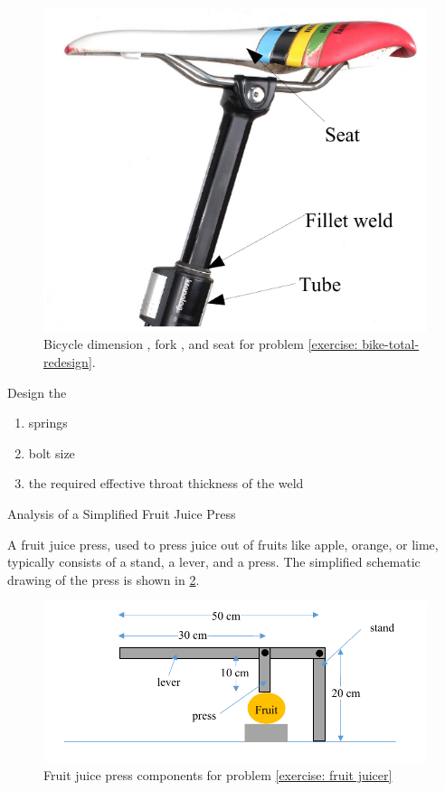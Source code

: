 \documentclass[
10pt,
a4paper,
openany,
svgnames,
]{book}
\newcommand{\exercise}{%
\item \label{lab:\arabic{chapter}-\arabic{exercisesi}}  %
}
\begin{document}
\begin{exercises}
\begin{figure}[h]
    \includegraphics[scale=0.7]{pictures/Machine-interaction/bicycle-seat}
    \caption{Bicycle dimension \cite{ai2bike}, fork \cite{zackbikefork}, and seat \cite{dresselseatpost} for problem \ref{exercise: bike-total-redesign}. }
    \label{fig: bike-example}
  \end{figure}
  
  Design the
  \begin{enumerate}
  \item springs
  \item bolt size
  \item the required effective throat thickness of the weld
  \end{enumerate}
  
  \exercise \label{exercise: fruit juicer} Analysis of a Simplified Fruit Juice Press
  
  A fruit juice press, used to press juice out of fruits like apple, orange, or lime, typically consists of a stand, a lever, and a press. The simplified schematic drawing of the press is shown in \cref{fig: fruit juicer}.
  
  \begin{figure}[h]
    \centering
    \includegraphics[scale=1]{pictures/Machine-interaction/fruit-juicer}
    \caption{Fruit juice press components for problem \ref{exercise: fruit juicer} }
    \label{fig: fruit juicer}
  \end{figure}
  

\end{exercises}
\end{document}
